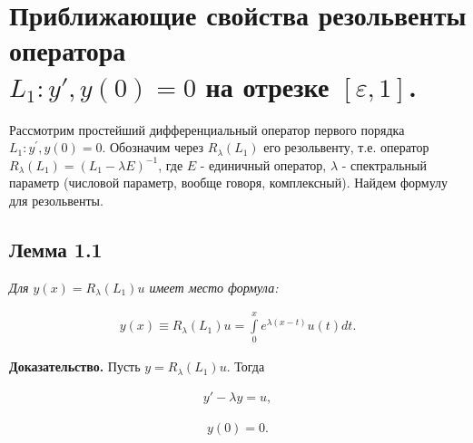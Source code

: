  


\renewcommand{\rmdefault}{cmr} %
\renewcommand{\sfdefault}{cmss} %
\renewcommand{\ttdefault}{cmtt} %





\tableofcontents

\abbrevdef
\intro
\chapter{Приближающие свойства резольвенты оператора \\ $ L_1:y', y(0)=0 $ на отрезке $ [\varepsilon, 1] $.}
Рассмотрим простейший дифференциальный оператор первого порядка $ L_1:y^{'}, y(0)=0 $. Обозначим через $ R_\lambda(L_1) $ его резольвенту, т.е. оператор $ R_\lambda(L_1)=(L_1-\lambda E)^{-1} $, где $ E $ - единичный оператор, $ \lambda $ - спектральный параметр (числовой параметр,  вообще говоря, комплексный). Найдем формулу для резольвенты.

\section{Лемма 1.1}
\label{lemma1.1}

\textit{Для $ y(x) = R_\lambda(L_1)u$ имеет место формула:}

\begin{equation}
\begin{array}{c}

y(x) \equiv R_\lambda(L_1)u = \int\limits_0^x e^{\lambda(x-t)}u(t)dt.

\end{array}
\end{equation}

\textbf{Доказательство.} Пусть $ y = R_\lambda(L_1)u$. Тогда

\begin{equation}
\begin{array}{c}

y'- \lambda y = u,

\end{array}
\end{equation}

\begin{equation}
\begin{array}{c}

y(0)=0.

\end{array}
\end{equation}

